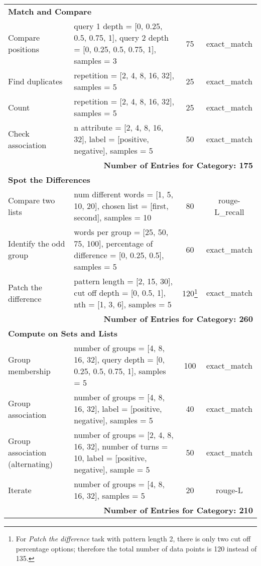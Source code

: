 \begin{longtable}{lp{6.5cm}cc}
\multicolumn{4}{l}{\textbf{Match and Compare}} \\ 
Compare positions & query 1 depth = [0, 0.25, 0.5, 0.75, 1], query 2 depth = [0, 0.25, 0.5, 0.75, 1], samples = 3 & 75 & exact\_match \\ 
Find duplicates & repetition = [2, 4, 8, 16, 32], samples = 5 & 25 & exact\_match \\ 
Count & repetition = [2, 4, 8, 16, 32], samples = 5 & 25 & exact\_match \\ 
Check association & n attribute = [2, 4, 8, 16, 32], label = [positive, negative], samples = 5 & 50 & exact\_match \\
\midrule
\multicolumn{4}{r}{\textbf{Number of Entries for Category: 175}} \\ 
\midrule

\multicolumn{4}{l}{\textbf{Spot the Differences}} \\ 
Compare two lists & num different words = [1, 5, 10, 20], chosen list = [first, second], samples = 10 & 80 & rouge-L\_recall \\ 
Identify the odd group & words per group = [25, 50, 75, 100], percentage of difference = [0, 0.25, 0.5], samples = 5 & 60 & exact\_match \\ 
Patch the difference & pattern length = [2, 15, 30],  cut off depth = [0, 0.5, 1], nth = [1, 3, 6], samples = 5 & 120\footnote{For \textit{Patch the difference} task with pattern length 2, there is only two cut off percentage options; therefore the total number of data points is 120 instead of 135.} & exact\_match \\ 
\midrule
\multicolumn{4}{r}{\textbf{Number of Entries for Category: 260}} \\ 
\midrule

\multicolumn{4}{l}{\textbf{Compute on Sets and Lists}} \\ 
Group membership & number of groups = [4, 8, 16, 32], query depth = [0, 0.25, 0.5, 0.75, 1], samples = 5 & 100 & exact\_match \\ 
Group association & number of groups = [4, 8, 16, 32], label = [positive, negative], samples = 5  & 40 & exact\_match \\ 
Group association (alternating) & number of groups = [2, 4, 8, 16, 32], number of turns = 10, label = [positive, negative], sample = 5 & 50 & exact\_match \\
Iterate & number of groups = [4, 8, 16, 32], samples = 5 & 20 & rouge-L \\ 
\midrule
\multicolumn{4}{r}{\textbf{Number of Entries for Category: 210}} \\ 
\midrule


\end{longtable}
